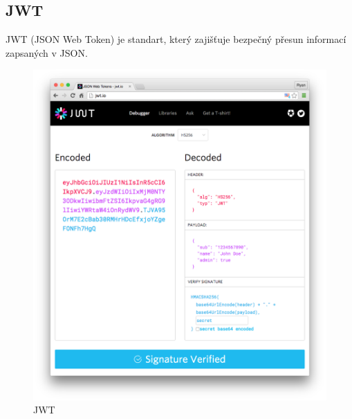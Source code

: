 \documentclass[thesis=B,czech]{FITthesis}[2012/06/26]
\begin{document}
        \subsection{JWT}
            JWT (JSON Web Token) je standart, který zajišťuje bezpečný přesun informací zapsaných v JSON.
            \begin{figure}[ht!]
                \includegraphics[scale=0.4]{legacy-app-auth-5}
                \caption{JWT}
            \end{figure}
            
\end{document}
